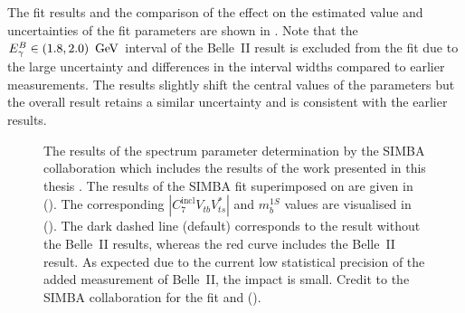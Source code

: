 The fit results and the comparison of the effect on the estimated value and uncertainties of the fit parameters are shown in .
Note that the ${E^B_{\gamma}}\in(1.8,2.0)~\mathrm{\,Ge\kern -0.1em V}$ interval of the Belle~II result is excluded from the fit due to the large uncertainty and differences in the interval widths compared to earlier \BtoXsgamma measurements.
The results slightly shift the central values of the parameters but the overall result retains a similar uncertainty and is consistent with the earlier results.
\begin{figure}[hbtp!]
    \centering
    \caption{\label{fig:simba_c7}
    The results of the \BtoXsgamma spectrum parameter determination by the SIMBA collaboration which includes the results of the work presented in this thesis
    \cite{Bernlochner:2020jlt}.
    The results of the SIMBA fit superimposed on  are given in ().
    The corresponding $|C^{\mathrm{incl}}_7V^{}_{tb}V^*_{ts}|$ and $m_b^{1S}$ values are visualised in ().
    The dark dashed line (default) corresponds to the result without the Belle~II results, whereas the red curve includes the Belle~II result.
    As expected due to the current low statistical precision of the added \BtoXsgamma measurement of Belle~II, the impact is small.
    Credit to the SIMBA collaboration for the fit and ().
    }
\end{figure}

